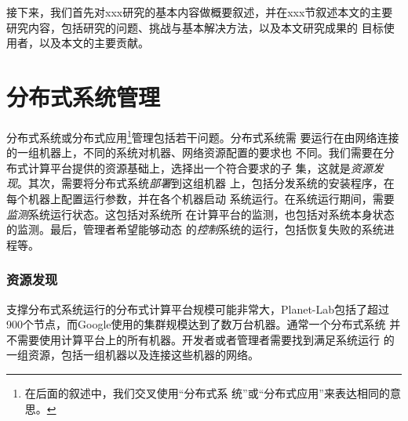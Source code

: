 接下来，我们首先对xxx研究的基本内容做概要叙述，并在xxx节叙述本文的主要
研究内容，包括研究的问题、挑战与基本解决方法，以及本文研究成果的
目标使用者，以及本文的主要贡献。






% 
% 
% 
% 
% 

\section{分布式系统管理}

分布式系统或分布式应用\footnote{在后面的叙述中，我们交叉使用“分布式系
统”或“分布式应用”来表达相同的意思。}管理包括若干问题。分布式系统需
要运行在由网络连接的一组机器上，不同的系统对机器、网络资源配置的要求也
不同。我们需要在分布式计算平台提供的资源基础上，选择出一个符合要求的子
集，这就是\emph{资源发现}。其次，需要将分布式系统\emph{部署}到这组机器
上，包括分发系统的安装程序，在每个机器上配置运行参数，并在各个机器启动
系统运行。在系统运行期间，需要\emph{监测}系统运行状态。这包括对系统所
在计算平台的监测，也包括对系统本身状态的监测。最后，管理者希望能够动态
的\emph{控制}系统的运行，包括恢复失败的系统进程等。

\subsubsection*{资源发现}

支撑分布式系统运行的分布式计算平台规模可能非常大，Planet-Lab包括了超过
900个节点，而Google使用的集群规模达到了数万台机器。通常一个分布式系统
并不需要使用计算平台上的所有机器。开发者或者管理者需要找到满足系统运行
的一组资源，包括一组机器以及连接这些机器的网络。

